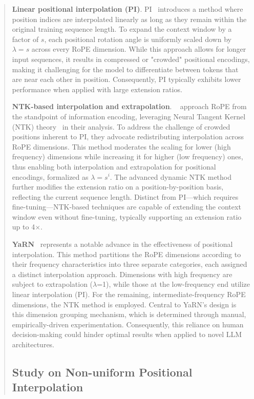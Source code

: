\begin{abstract}
\textbf{Linear positional interpolation (PI)}. PI~\cite{pi} introduces a method where position indices are interpolated linearly as long as they remain within the original training sequence length. To expand the context window by a factor of $s$, each positional rotation angle is uniformly scaled down by $\lambda = s$ across every RoPE dimension. While this approach allows for longer input sequences, it results in compressed or "crowded" positional encodings, making it challenging for the model to differentiate between tokens that are near each other in position. Consequently, PI typically exhibits lower performance when applied with large extension ratios.

\textbf{NTK-based interpolation and extrapolation}. ~\cite{ntk,dynamicntk} approach RoPE from the standpoint of information encoding, leveraging Neural Tangent Kernel (NTK) theory~\cite{jacot2018neural,tancik2020fourier} in their analysis. To address the challenge of crowded positions inherent to PI, they advocate redistributing interpolation across RoPE dimensions. This method moderates the scaling for lower (high frequency) dimensions while increasing it for higher (low frequency) ones, thus enabling both interpolation and extrapolation for positional encodings, formalized as $\lambda=s^{i}$. The advanced dynamic NTK method~\cite{dynamicntk} further modifies the extension ratio on a position-by-position basis, reflecting the current sequence length. Distinct from PI—which requires fine-tuning—NTK-based techniques are capable of extending the context window even without fine-tuning, typically supporting an extension ratio up to 4$\times$.

\textbf{YaRN}~\cite{yarn} represents a notable advance in the effectiveness of positional interpolation. This method partitions the RoPE dimensions according to their frequency characteristics into three separate categories, each assigned a distinct interpolation approach. Dimensions with high frequency are subject to extrapolation ($\lambda$=1), while those at the low-frequency end utilize linear interpolation (PI). For the remaining, intermediate-frequency RoPE dimensions, the NTK method is employed. Central to YaRN’s design is this dimension grouping mechanism, which is determined through manual, empirically-driven experimentation. Consequently, this reliance on human decision-making could hinder optimal results when applied to novel LLM architectures.

\subsection{Study on Non-uniform Positional Interpolation}


\end{abstract}
